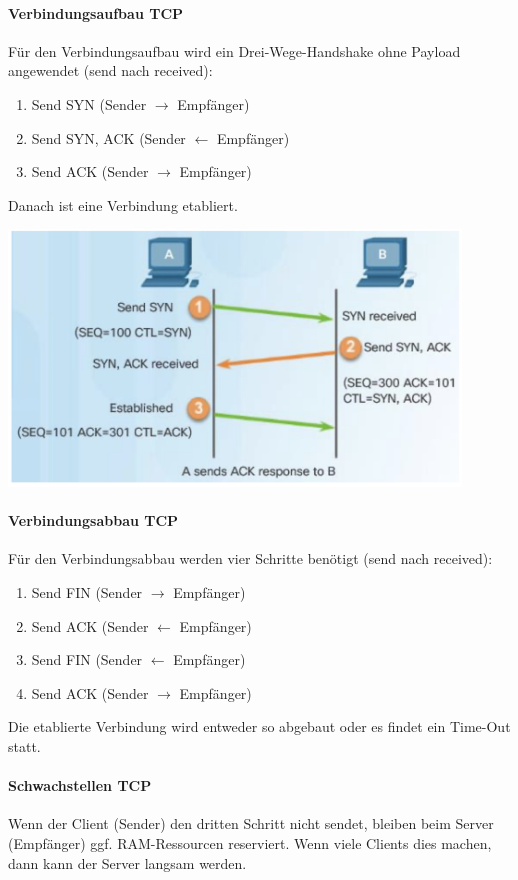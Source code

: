 \documentclass[a4paper,12pt]{article}
\begin{document}
\paragraph{Verbindungsaufbau TCP} Für den Verbindungsaufbau wird ein Drei-Wege-Handshake ohne Payload angewendet (send nach received):
\begin{enumerate}
\item Send SYN (Sender $ \rightarrow $ Empfänger)
\item Send SYN, ACK (Sender $ \leftarrow $ Empfänger)
\item Send  ACK (Sender $ \rightarrow $ Empfänger)
\end{enumerate}

Danach ist eine Verbindung etabliert.


\begin{center}
\includegraphics[width=12cm]{img/09_tcp_handshake.png}
\end{center}

\paragraph{Verbindungsabbau TCP} Für den Verbindungsabbau werden vier Schritte benötigt (send nach received):
\begin{enumerate}
\item Send FIN (Sender $ \rightarrow $ Empfänger)
\item Send ACK (Sender $ \leftarrow $ Empfänger)
\item Send  FIN (Sender $ \leftarrow $ Empfänger)
\item Send  ACK (Sender $ \rightarrow $ Empfänger)
\end{enumerate}

Die etablierte Verbindung wird entweder so abgebaut oder es findet ein Time-Out statt.

\paragraph{Schwachstellen TCP} Wenn der Client (Sender) den dritten Schritt nicht sendet, bleiben beim Server (Empfänger) ggf. RAM-Ressourcen reserviert. Wenn viele Clients dies machen, dann kann der Server langsam werden.
\end{document}
